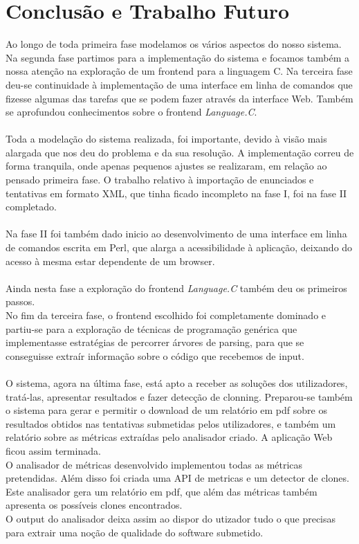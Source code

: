 \chapter{Conclusão e Trabalho Futuro}\label{chap con} 
Ao longo de toda primeira fase modelamos os vários aspectos do nosso sistema. Na segunda fase partimos para a implementação do
sistema e focamos também a nossa atenção na exploração de um frontend para a linguagem C. Na terceira fase deu-se continuidade à  implementação de uma interface em linha de comandos que fizesse algumas das tarefas que se podem fazer através da interface Web. Também se aprofundou conhecimentos sobre o frontend \textit{Language.C}.\\
\\
Toda a modelação do sistema realizada, foi importante, devido à visão mais alargada que nos deu do problema e da sua resolução.
A implementação correu de forma tranquila, onde apenas pequenos ajustes se realizaram, em relação ao pensado primeira fase.
O trabalho relativo à importação de enunciados e tentativas em formato XML, que tinha ficado incompleto na fase I, foi na fase II
completado.\\
\\
Na fase II foi também dado inicio ao desenvolvimento de uma interface em linha de comandos escrita em Perl, que alarga a acessibilidade à
aplicação, deixando do acesso à mesma estar dependente de um browser.\\
\\
Ainda nesta fase a exploração do frontend \textit{Language.C} também deu os primeiros passos.\\
No fim da terceira fase, o frontend escolhido foi completamente dominado e partiu-se para a exploração de técnicas de programação genérica que
implementasse estratégias de percorrer árvores de parsing, para que se conseguisse extraír informação sobre o código que recebemos de input.\\
\\
O sistema, agora na última fase, está apto a receber as soluções dos utilizadores, tratá-las, apresentar resultados e fazer detecção de clonning. Preparou-se também o sistema para gerar e permitir o download de um relatório em pdf sobre os resultados obtidos nas tentativas submetidas pelos utilizadores, e também um relatório sobre as métricas extraídas pelo analisador criado. A aplicação Web ficou assim terminada.\\
O analisador de métricas desenvolvido implementou todas as métricas pretendidas. Além disso foi criada uma API de metricas e um detector de clones. Este analisador gera um relatório em pdf, que além das métricas também apresenta os possíveis clones encontrados.\\
O output do analisador deixa assim ao dispor do utizador tudo o que precisas para extrair uma noção de qualidade do software submetido.

